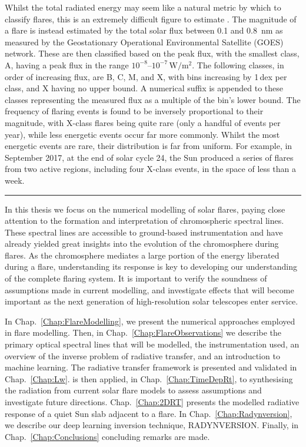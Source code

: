 Whilst the total radiated energy may seem like a natural metric by which to classify flares, this is an extremely difficult figure to estimate \citep[e.g.][]{Milligan2014}.
The magnitude of a flare is instead estimated by the total solar flux between 0.1 and \SI{0.8}{\nano\metre} as measured by the Geostationary Operational Environmental Satellite (GOES) network.
These are then classified based on the peak flux, with the smallest class, A, having a peak flux in the range $10^{-8}$--$10^{-7}\,\si{\watt\per\square\m}$.
The following classes, in order of increasing flux, are B, C, M, and X, with bins increasing by 1\,dex per class, and X having no upper bound.
A numerical suffix is appended to these classes representing the measured flux as a multiple of the bin's lower bound.
The frequency of flaring events is found to be inversely proportional to their magnitude, with X-class flares being quite rare (only a handful of events per year), while less energetic events occur far more commonly.
Whilst the most energetic events are rare, their distribution is far from uniform.
For example, in September 2017, at the end of solar cycle 24, the Sun produced a series of flares from two active regions, including four X-class events, in the space of less than a week.

\begin{center}
    \rule{0.5\textwidth}{0.6pt}
\end{center}

In this thesis we focus on the numerical modelling of solar flares, paying close attention to the formation and interpretation of chromospheric spectral lines.
These spectral lines are accessible to ground-based instrumentation and have already yielded great insights into the evolution of the chromosphere during flares.
As the chromosphere mediates a large portion of the energy liberated during a flare, understanding its response is key to developing our understanding of the complete flaring system.
It is important to verify the soundness of assumptions made in current modelling, and investigate effects that will become important as the next generation of high-resolution solar telescopes enter service.

In Chap.~\ref{Chap:FlareModelling}, we present the numerical approaches employed in flare modelling.
Then, in Chap.~\ref{Chap:FlareObservations} we describe the primary optical spectral lines that will be modelled, the instrumentation used, an overview of the inverse problem of radiative transfer, and an introduction to machine learning.
The \Lw{} radiative transfer framework is presented and validated in Chap.~\ref{Chap:Lw}.
\Lw{} is then applied, in Chap.~\ref{Chap:TimeDepRt}, to synthesising the radiation from current solar flare models to assess assumptions and investigate future directions.
Chap.~\ref{Chap:2DRT} presents the modelled radiative response of a quiet Sun slab adjacent to a flare.
In Chap.~\ref{Chap:Radynversion}, we describe our deep learning inversion technique, RADYNVERSION.
Finally, in Chap.~\ref{Chap:Conclusions} concluding remarks are made.


